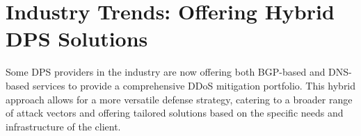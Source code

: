 \section{Industry Trends: Offering Hybrid DPS Solutions}\label{sec:solutions}
Some DPS providers in the industry are now offering both BGP-based and DNS-based services to provide a comprehensive DDoS mitigation portfolio. This hybrid approach allows for a more versatile defense strategy, catering to a broader range of attack vectors and offering tailored solutions based on the specific needs and infrastructure of the client.

